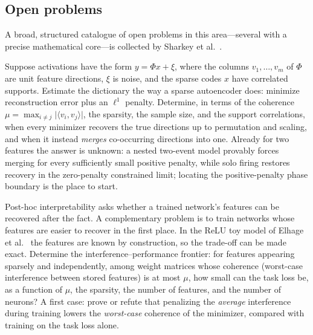 \subsection{Open problems}

\noindent A broad, structured catalogue of open problems in this area---several with a precise mathematical core---is collected by Sharkey et al.~\cite{sharkey2025}.

\begin{openproblem}
Suppose activations have the form $y=\Phi x+\xi$, where the columns $v_1,\dots,v_m$ of $\Phi$ are unit feature directions, $\xi$ is noise, and the sparse codes $x$ have correlated supports. Estimate the dictionary the way a sparse autoencoder does: minimize reconstruction error plus an $\ell^1$ penalty. Determine, in terms of the coherence $\mu=\max_{i\neq j}\lvert\langle v_i,v_j\rangle\rvert$, the sparsity, the sample size, and the support correlations, when every minimizer recovers the true directions up to permutation and scaling, and when it instead \emph{merges} co-occurring directions into one. Already for two features the answer is unknown: a nested two-event model provably forces merging for every sufficiently small positive penalty, while solo firing restores recovery in the zero-penalty constrained limit; locating the positive-penalty phase boundary is the place to start.
\end{openproblem}

\begin{openproblem}
Post-hoc interpretability asks whether a trained network's features can be recovered after the fact. A complementary problem is to train networks whose features are easier to recover in the first place. In the ReLU toy model of Elhage et al.~\cite{elhage2022} the features are known by construction, so the trade-off can be made exact. Determine the interference--performance frontier: for features appearing sparsely and independently, among weight matrices whose coherence (worst-case interference between stored features) is at most $\mu$, how small can the task loss be, as a function of $\mu$, the sparsity, the number of features, and the number of neurons? A first case: prove or refute that penalizing the \emph{average} interference during training lowers the \emph{worst-case} coherence of the minimizer, compared with training on the task loss alone.
\end{openproblem}

